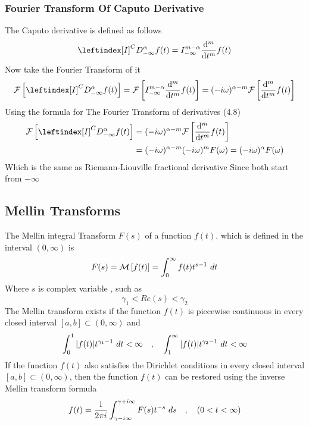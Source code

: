 \subsubsection{Fourier Transform Of Caputo Derivative}
The Caputo derivative is defined as follows
\[
    \leftindex[I]^C{D_{-\infty}^\alpha} f(t) = I_{-\infty}^{m-\alpha} \dv[m]{}{t} f(t)
\]
Now take the Fourier Transform of it 
\[
    \mathcal{F}\left[ \leftindex[I]^C{D_{-\infty}^\alpha} f(t) \right] = \mathcal{F}\left[ I_{-\infty}^{m-\alpha} \dv[m]{}{t} f(t) \right] = (-i\omega)^{\alpha-m} \mathcal{F}\left[ \dv[m]{}{t} f(t) \right]
\]
Using the formula for The Fourier Transform of derivatives (4.8)
\begin{align*}
    \mathcal{F}\left[ \leftindex[I]^C{D_{-\infty}^\alpha} f(t) \right] &= (-i\omega)^{\alpha-m} \mathcal{F}\left[ \dv[m]{}{t} f(t) \right]
    \\
    &= (-i\omega)^{\alpha-m}(-i\omega)^{m}F(\omega) = (-i\omega)^{\alpha}F(\omega)
\end{align*}
Which is the same as Riemann-Liouville fractional derivative Since both start from $-\infty$
\newpage
\subsection{Mellin Transforms}
The Mellin integral Transform $F(s)$ of a function $f(t)$.
which is defined in the interval $(0,\infty)$ is
\begin{equation}
    F(s) = \mathcal{M}\left[ f(t) \right] = \int_{0}^{\infty} f(t) t^{s-1} \,\, dt
\end{equation}
Where $s$ is complex variable , such as 
\[
\gamma_1 < Re(s) < \gamma_2    
\]
The Mellin transform exists if the function $f(t)$ is piecewise
continuous in every closed interval $[a, b] \subset (0, \infty)$ and
\[
    \int_{0}^{1} |f(t)| t^{\gamma_1-1} \,\, dt < \infty \quad,\quad \int_{1}^{\infty} |f(t)| t^{\gamma_2-1} \,\, dt < \infty
\]
If the function $f(t)$ also satisfies the Dirichlet conditions in every
closed interval $[a, b] \subset (0, \infty)$, then the function $f(t)$ can be restored
using the inverse Mellin transform formula
\[
f(t) = \frac{1}{2\pi i} \int_{\gamma-i\infty}^{\gamma+i\infty} F(s)t^{-s} \,\, ds \quad,\quad (0<t<\infty)
\]

